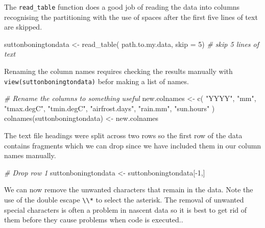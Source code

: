\documentclass{article}
\newenvironment{Shaded}{\begin{snugshade}}{\end{snugshade}}
\newcommand{\AttributeTok}[1]{\textcolor[rgb]{0.77,0.63,0.00}{#1}}
\newcommand{\CommentTok}[1]{\textcolor[rgb]{0.56,0.35,0.01}{\textit{#1}}}
\newcommand{\DecValTok}[1]{\textcolor[rgb]{0.00,0.00,0.81}{#1}}
\newcommand{\FunctionTok}[1]{\textcolor[rgb]{0.00,0.00,0.00}{#1}}
\newcommand{\NormalTok}[1]{#1}
\newcommand{\OtherTok}[1]{\textcolor[rgb]{0.56,0.35,0.01}{#1}}
\newcommand{\SpecialCharTok}[1]{\textcolor[rgb]{0.00,0.00,0.00}{#1}}
\newcommand{\StringTok}[1]{\textcolor[rgb]{0.31,0.60,0.02}{#1}}
\begin{document}
The \texttt{read\_table} function does a good job of reading the data into columns recognising the partitioning with the use of spaces after the first five lines of text are skipped.

\begin{Shaded}
\begin{Highlighting}[]
\NormalTok{suttonboningtondata }\OtherTok{\textless{}{-}} \FunctionTok{read\_table}\NormalTok{(}
\NormalTok{                        path.to.my.data, }
                        \AttributeTok{skip =} \DecValTok{5}\NormalTok{) }\CommentTok{\# skip 5 lines of text}
\end{Highlighting}
\end{Shaded}

Renaming the column names requires checking the results manually with \texttt{view(suttonboningtondata)} befor making a list of names.

\begin{Shaded}
\begin{Highlighting}[]
\CommentTok{\# Rename the columns to something useful}
\NormalTok{new.colnames }\OtherTok{\textless{}{-}} \FunctionTok{c}\NormalTok{( }\StringTok{"YYYY"}\NormalTok{,}
                   \StringTok{"mm"}\NormalTok{,}
                   \StringTok{"tmax.degC"}\NormalTok{,}
                   \StringTok{"tmin.degC"}\NormalTok{,}
                   \StringTok{"airfrost.days"}\NormalTok{,}
                   \StringTok{"rain.mm"}\NormalTok{,}
                   \StringTok{"sun.hours"}
\NormalTok{  )}
\FunctionTok{colnames}\NormalTok{(suttonboningtondata) }\OtherTok{\textless{}{-}}\NormalTok{ new.colnames}
\end{Highlighting}
\end{Shaded}

The text file headings were split across two rows so the first row of the data contains fragments which we can drop since we have included them in our column names manually.

\begin{Shaded}
\begin{Highlighting}[]
\CommentTok{\# Drop row 1}
\NormalTok{suttonboningtondata }\OtherTok{\textless{}{-}}\NormalTok{ suttonboningtondata[}\SpecialCharTok{{-}}\DecValTok{1}\NormalTok{,]}
\end{Highlighting}
\end{Shaded}

We can now remove the unwanted characters that remain in the data. Note the use of the double escape \texttt{\textbackslash{}\textbackslash{}*} to select the asterisk. The removal of unwanted special characters is often a problem in nascent data so it is best to get rid of them before they cause problems when code is executed..
\end{document}
